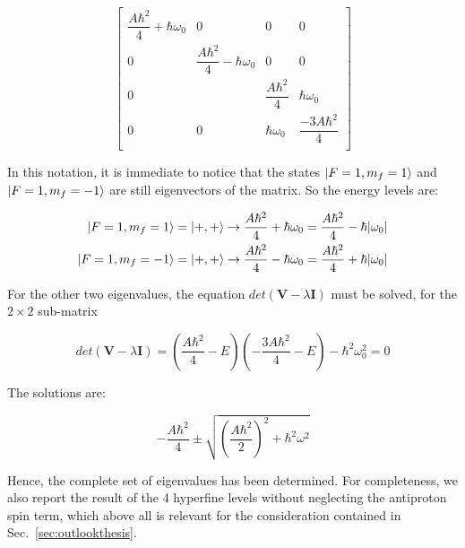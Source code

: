\begin{equation}
\begin{bmatrix}
\dfrac{A \hbar^{2}}{4}  + \hbar \omega_0 & 0                                       & 0                    & 0 \\
0                                       & \dfrac{A \hbar^{2}}{4}  - \hbar \omega_0 & 0                    & 0 \\
0                                       &                                          & \dfrac{A \hbar^2}{4} & \hbar \omega_0\\
0                                       & 0                                        & \hbar \omega_0       & \dfrac{- 3 A \hbar^2}{4}\\
\end{bmatrix}
\end{equation}

In this notation, it is immediate to notice that the states $\ket{F = 1, m_f = 1}$ and $\ket{F = 1,m_f = -1}$ are still eigenvectors of the matrix. So the energy levels are:

\begin{align}
\ket{F = 1, m_f = 1} &= \ket{+,+} \rightarrow \dfrac{A \hbar^2}{4} + \hbar \omega_0 = \dfrac{A \hbar^2}{4} - \hbar \abs{\omega_0} \\ \ket{F = 1, m_f = -1} &= \ket{+,+} \rightarrow \dfrac{A \hbar^2}{4} - \hbar \omega_0 = \dfrac{A \hbar^2}{4} + \hbar \abs{\omega_0}
\end{align}

For the other two eigenvalues, the equation $det(\mathbf{V} - \lambda \mathbf{I})$ must be solved, for the $2\times 2$ sub-matrix

\begin{equation}
det(\mathbf{V} - \lambda \mathbf{I}) = (\frac{A \hbar^2}{4} - E) (- \frac{3 A \hbar^2}{4} - E) - \hbar^2 \omega_0^2 = 0
\end{equation}

The solutions are:

\begin{equation}
- \frac{A \hbar^2}{4} \pm \sqrt{(\frac{A \hbar^2}{2})^2 + \hbar^2 \omega^2}
\end{equation}

Hence, the complete set of eigenvalues has been determined. For completeness, we also report the result of the 4 hyperfine levels without neglecting the antiproton spin term, which above all is relevant for the consideration contained in Sec.~\ref{sec:outlookthesis}.  

